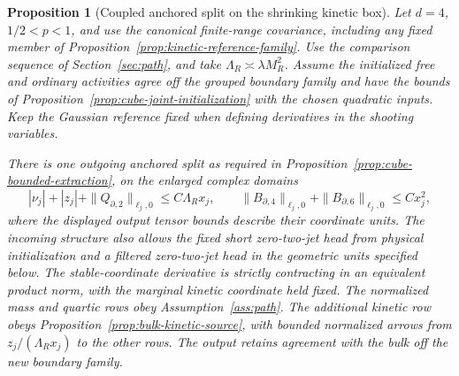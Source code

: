 \documentclass[11pt]{article}
\newtheorem{proposition}[theorem]{Proposition}
\theoremstyle{definition}
\begin{document}
\begin{proposition}[Coupled anchored split on the shrinking kinetic box]
\label{prop:residual-coupled-chart}
Let \(d=4\), \(1/2<p<1\), and use the canonical finite-range
covariance, including any fixed member of
Proposition~\ref{prop:kinetic-reference-family}.
Use the comparison sequence of Section~\ref{sec:path}, and take
\(\Lambda_R\asymp\lambda M_R^2\). Assume the initialized
free and ordinary activities agree off the grouped boundary family
and have the bounds of Proposition~\ref{prop:cube-joint-initialization}
with the chosen quadratic inputs. Keep the Gaussian reference fixed
when defining derivatives in the shooting variables.

There is one outgoing anchored split as required in
Proposition~\ref{prop:cube-bounded-extraction}, on the enlarged
complex domains
\begin{equation}
 |\nu_j|+|z_j|+\|Q_{\partial,2}\|_{\ell_j,0}
                    \le C\Lambda_R x_j,\qquad
 \|B_{\partial,4}\|_{\ell_j,0}+\|B_{\partial,6}\|_{\ell_j,0}
                    \le Cx_j^2 ,
\end{equation}
where the displayed output tensor bounds describe their
coordinate units. The incoming structure also allows the fixed
short zero-two-jet head from physical initialization and a
filtered zero-two-jet head in the geometric units specified
below. The stable-coordinate derivative is strictly contracting
in an equivalent product norm, with the marginal kinetic
coordinate held fixed. The normalized mass and quartic rows
obey Assumption~\ref{ass:path}. The additional kinetic row
obeys Proposition~\ref{prop:bulk-kinetic-source}, with bounded
normalized arrows from \(z_j/(\Lambda_R x_j)\) to the other
rows. The output retains agreement with the bulk off the new
boundary family.
\end{proposition}
\end{document}
